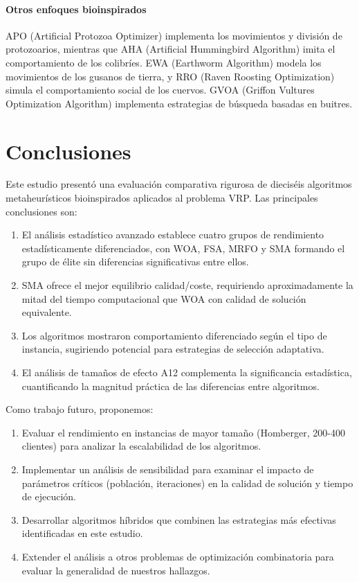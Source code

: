 \documentclass[conference,a4paper]{IEEEtran}
\begin{document}
\paragraph{Otros enfoques bioinspirados} APO (Artificial Protozoa Optimizer) \cite{Wang2024APO} implementa los movimientos y división de protozoarios, mientras que AHA (Artificial Hummingbird Algorithm) \cite{Zhao2022AHA} imita el comportamiento de los colibríes. EWA (Earthworm Algorithm) \cite{Wang2018EWA} modela los movimientos de los gusanos de tierra, y RRO (Raven Roosting Optimization) \cite{Brabazon2016RRO} simula el comportamiento social de los cuervos. GVOA (Griffon Vultures Optimization Algorithm) \cite{Hasan2025GVOA} implementa estrategias de búsqueda basadas en buitres.

\section{Conclusiones}\vspace{-0.2cm}

Este estudio presentó una evaluación comparativa rigurosa de dieciséis algoritmos metaheurísticos bioinspirados aplicados al problema VRP. Las principales conclusiones son:

\begin{enumerate}
\item El análisis estadístico avanzado establece cuatro grupos de rendimiento estadísticamente diferenciados, con WOA, FSA, MRFO y SMA formando el grupo de élite sin diferencias significativas entre ellos.
\item SMA ofrece el mejor equilibrio calidad/coste, requiriendo aproximadamente la mitad del tiempo computacional que WOA con calidad de solución equivalente.
\item Los algoritmos mostraron comportamiento diferenciado según el tipo de instancia, sugiriendo potencial para estrategias de selección adaptativa.
\item El análisis de tamaños de efecto A12 complementa la significancia estadística, cuantificando la magnitud práctica de las diferencias entre algoritmos.
\end{enumerate}

Como trabajo futuro, proponemos:

\begin{enumerate}
\item Evaluar el rendimiento en instancias de mayor tamaño (Homberger, 200-400 clientes) para analizar la escalabilidad de los algoritmos.
\item Implementar un análisis de sensibilidad para examinar el impacto de parámetros críticos (población, iteraciones) en la calidad de solución y tiempo de ejecución.
\item Desarrollar algoritmos híbridos que combinen las estrategias más efectivas identificadas en este estudio.
\item Extender el análisis a otros problemas de optimización combinatoria para evaluar la generalidad de nuestros hallazgos.
\end{enumerate}



\end{document}
